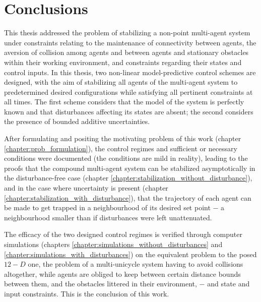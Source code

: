 \chapter{Conclusions}

This thesis addressed the problem of stabilizing a non-point multi-agent system
under constraints relating to the maintenance of connectivity between
agents, the aversion of collision among agents and between agents and
stationary obstacles within their working environment, and constraints
regarding their states and control inputs. In this thesis, two non-linear
model-predictive control schemes are designed, with the aim of stabilizing
all agents of the multi-agent system to predetermined desired configurations
while satisfying all pertinent constraints at all times. The first scheme
considers that the model of the system is perfectly known and that disturbances
affecting its states are absent; the second considers the presence of
bounded additive uncertainties.

After formulating and positing the motivating problem of this work
(chapter \ref{chapter:prob_formulation}), the control regimes and sufficient or
necessary conditions were documented (the conditions are mild in reality),
leading to the proofs that the compound multi-agent system can be stabilized
asymptotically in the disturbance-free case
(chapter \ref{chapter:stabilization_without_disturbance}), and in the case where
uncertainty is present (chapter \ref{chapter:stabilization_with_disturbance}),
that the trajectory of each agent can be made to get trapped in a neighbourhood
of its desired set point $-$ a neighbourhood smaller than if disturbances
were left unattenuated.

The efficacy of the two designed control regimes is verified through computer
simulations (chapters \ref{chapter:simulations_without_disturbances} and
\ref{chapter:simulations_with_disturbances}) on the equivalent problem to the
posed $12-D$ one, the problem of a multi-unicycle system having to avoid
collisions altogether, while agents are obliged to keep between certain distance
bounds between them, and the obstacles littered in their environment, $-$ and
state and input constraints. This is the conclusion of this work.
